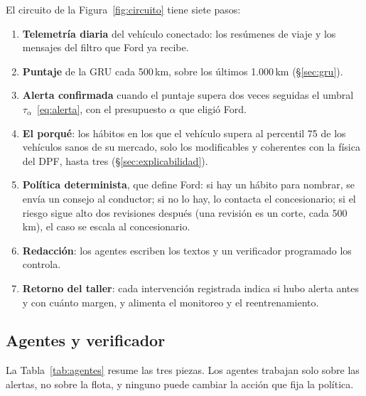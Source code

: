El circuito de la Figura~\ref{fig:circuito} tiene siete pasos:
\begin{enumerate}
  \item \textbf{Telemetría diaria} del vehículo conectado: los resúmenes de viaje y los mensajes del filtro que Ford ya recibe.
  \item \textbf{Puntaje} de la GRU cada 500\,km, sobre los últimos 1.000\,km (\S\ref{sec:gru}).
  \item \textbf{Alerta confirmada} cuando el puntaje supera dos veces seguidas el umbral $\tau_\alpha$~\eqref{eq:alerta},
    con el presupuesto $\alpha$ que eligió Ford.
  \item \textbf{El porqué}: los hábitos en los que el vehículo supera al percentil 75 de los vehículos sanos de su mercado,
    solo los modificables y coherentes con la física del DPF, hasta tres (\S\ref{sec:explicabilidad}).
  \item \textbf{Política determinista}, que define Ford: si hay un hábito para nombrar, se envía un consejo al conductor; si
    no lo hay, lo contacta el concesionario; si el riesgo sigue alto dos revisiones después (una revisión es un corte, cada
    500\,km), el caso se escala al concesionario.
  \item \textbf{Redacción}: los agentes escriben los textos y un verificador programado los controla.
  \item \textbf{Retorno del taller}: cada intervención registrada indica si hubo alerta antes y con cuánto margen, y alimenta
    el monitoreo y el reentrenamiento.
\end{enumerate}

\subsection{Agentes y verificador}

La Tabla~\ref{tab:agentes} resume las tres piezas. Los agentes trabajan solo sobre las alertas, no sobre la flota, y
ninguno puede cambiar la acción que fija la política.

